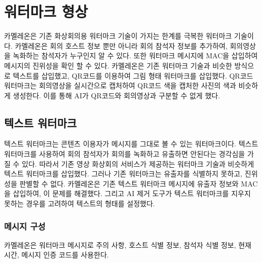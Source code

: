 \chapter{워터마크 형상}

카멜레온은 기존 화상회의용 워터마크 기술이 가지는 한계를 극복한 워터마크
기술이다. 카멜레온은 회의 호스트 정보 뿐만 아니라 회의 참석자 정보를 추가하여,
회의영상을 녹화하는 참석자가 누구인지 알 수 있다. 또한 워터마크 메시지에 MAC을
삽입하여 메시지의 진위성을 확인 할 수 있다. 카멜레온은 기존 워터마크 기술과
비슷한 방식으로 텍스트를 삽입했고, QR코드를 이용하여 그림 형태 워터마크를
삽입했다. QR코드 워터마크는 회의영상을 실시간으로 캡처하여 QR코드 색을 캡처한
사진의 색과 비슷하게 생성한다. 이를 통해 AI가 QR코드와 회의영상과 구분할 수 없게
했다.

\section{텍스트 워터마크}

텍스트 워터마크는 콘텐츠 이용자가 메시지를 그대로 볼 수 있는 워터마크이다.
텍스트 워터마크를 사용하여 회의 참석자가 회의를 녹화하고 유출하면 안된다는
경각심을 가질 수 있다. 따라서 기존 영상 화상회의 서비스가 제공하는 워터마크
기술과 비슷하게 텍스트 워터마크를 삽입했다. 그러나 기존 워터마크는 유출자를
식별하지 못하고, 진위성을 판별할 수 없다. 카멜레온은 기존 텍스트 워터마크
메시지에 유출자 정보와 MAC을 삽입하여, 이 문제를 해결했다. 그리고 AI 제거 도구가
텍스트 워터마크를 지우지 못하는 경우를 고려하여 텍스트의 형태를 설정했다.

\subsection*{메시지 구성}

카멜레온은 워터마크 메시지로 주의 사항, 호스트 식별 정보, 참석자 식별 정보, 현재
시간, 메시지 인증 코드를 사용한다.

